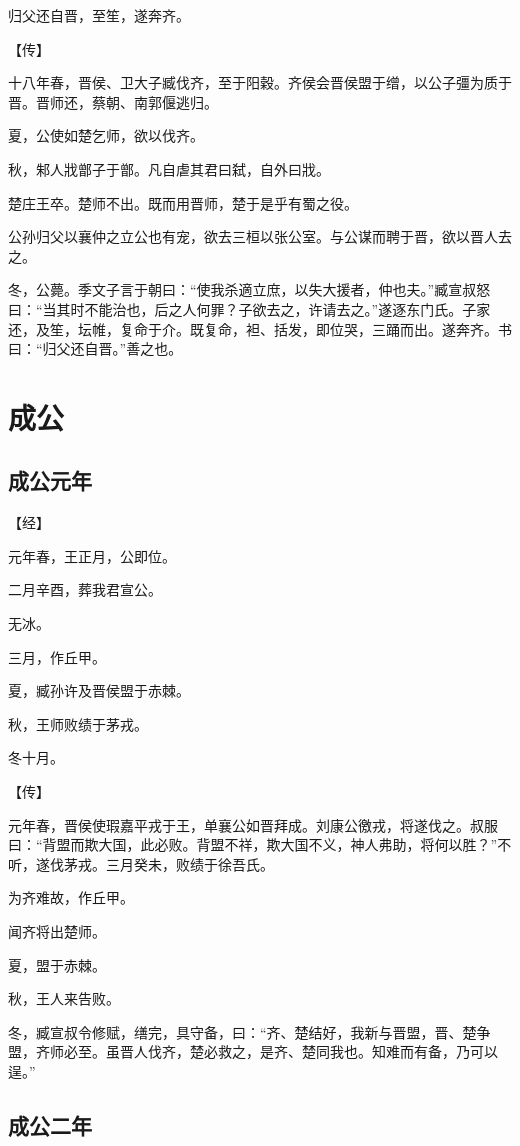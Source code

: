 \documentclass[a4paper,12pt,UTF8,twoside]{ctexbook}
\begin{document}
归父还自晋，至笙，遂奔齐。

【传】

十八年春，晋侯、卫大子臧伐齐，至于阳穀。齐侯会晋侯盟于缯，以公子彊为质于晋。晋师还，蔡朝、南郭偃逃归。

夏，公使如楚乞师，欲以伐齐。

秋，邾人戕鄫子于鄫。凡自虐其君曰弑，自外曰戕。

楚庄王卒。楚师不出。既而用晋师，楚于是乎有蜀之役。

公孙归父以襄仲之立公也有宠，欲去三桓以张公室。与公谋而聘于晋，欲以晋人去之。



冬，公薨。季文子言于朝曰：“使我杀適立庶，以失大援者，仲也夫。”臧宣叔怒曰：“当其时不能治也，后之人何罪？子欲去之，许请去之。”遂逐东门氏。子家还，及笙，坛帷，复命于介。既复命，袒、括发，即位哭，三踊而出。遂奔齐。书曰：“归父还自晋。”善之也。


\part{成公}

\chapter{成公元年}



【经】

元年春，王正月，公即位。

二月辛酉，葬我君宣公。

无冰。

三月，作丘甲。

夏，臧孙许及晋侯盟于赤棘。

秋，王师败绩于茅戎。

冬十月。

【传】

元年春，晋侯使瑕嘉平戎于王，单襄公如晋拜成。刘康公徼戎，将遂伐之。叔服曰：“背盟而欺大国，此必败。背盟不祥，欺大国不义，神人弗助，将何以胜？”不听，遂伐茅戎。三月癸未，败绩于徐吾氏。

为齐难故，作丘甲。

闻齐将出楚师。

夏，盟于赤棘。

秋，王人来告败。

冬，臧宣叔令修赋，缮完，具守备，曰：“齐、楚结好，我新与晋盟，晋、楚争盟，齐师必至。虽晋人伐齐，楚必救之，是齐、楚同我也。知难而有备，乃可以逞。”

\chapter{成公二年}
\end{document}
